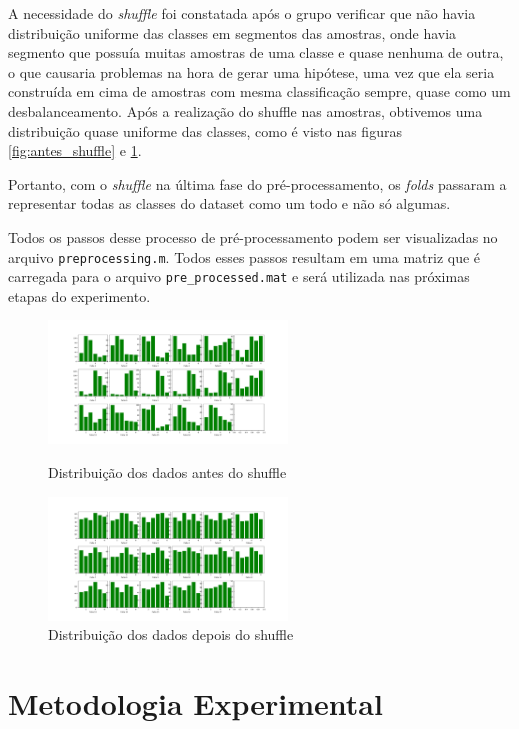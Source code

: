 \documentclass[10pt, conference, compsocconf]{IEEEtran}
\begin{document}
A necessidade do \textsl{shuffle} foi constatada após o grupo verificar que 
não havia distribuição uniforme das classes em segmentos das amostras, onde 
havia segmento que possuía muitas amostras de uma classe e quase nenhuma de 
outra, o que causaria problemas na hora de gerar uma hipótese, uma vez que ela
seria construída em cima de amostras com mesma classificação sempre, quase como
um desbalanceamento. Após a 
realização do shuffle nas amostras, obtivemos uma distribuição quase uniforme 
das classes, como é visto nas figuras \ref{fig:antes_shuffle} e
\ref{fig:apos_shuffle}. 

Portanto, com o \textsl{shuffle} na última fase do pré-processamento, os 
\textsl{folds} passaram a representar todas as classes do dataset como um todo e
não só algumas.
 
Todos os passos desse processo de pré-processamento podem ser visualizadas no
arquivo \texttt{preprocessing.m}. Todos esses passos resultam em uma matriz que é carregada para
o arquivo \texttt{pre\_processed.mat} e será utilizada nas próximas etapas do experimento. 

\begin{figure}[!t]
\centering
\includegraphics[width=2.5in]{imgs/antes_shuffle}
\caption{Distribuição dos dados antes do shuffle}
\label{fig:antes_shuffle}
\includegraphics[width=2.5in]{imgs/apos_shuffle}
\caption{Distribuição dos dados depois do shuffle}
\label{fig:apos_shuffle}
\end{figure}

\section{Metodologia Experimental}\label{sec:metodologia}
\end{document}

